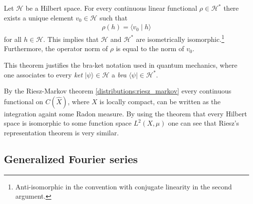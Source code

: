     \begin{theorem}\label{functional:riesz}
        Let $\mathcal{H}$ be a Hilbert space. For every continuous linear functional $\rho\in\mathcal{H}^*$ there exists a unique element $v_0\in\mathcal{H}$ such that
        \begin{gather}
            \rho(h) = \langle v_0\mid h \rangle
        \end{gather}
        for all $h\in\mathcal{H}$. This implies that $\mathcal{H}$ and $\mathcal{H}^*$ are isometrically isomorphic.\footnote{Anti-isomorphic in the convention with conjugate linearity in the second argument.} Furthermore, the operator norm of $\rho$ is equal to the norm of $v_0$.
    \end{theorem}
    \begin{remark}
        This theorem justifies the bra-ket notation used in quantum mechanics, where one associates to every \textit{ket} $\lvert\psi\rangle\in\mathcal{H}$ a \textit{bra} $\langle\psi\rvert\in\mathcal{H}^*$.
    \end{remark}

    \begin{remark}
        By the Riesz-Markov theorem \ref{distributions:riesz_markov} every continuous functional on $C(\widehat{X})$, where $X$ is locally compact, can be written as the integration againt some Radon measure. By using the theorem that every Hilbert space is isomorphic to some function space $L^2(X,\mu)$ one can see that Riesz's representation theorem is very similar.
    \end{remark}

\subsection{Generalized Fourier series}

